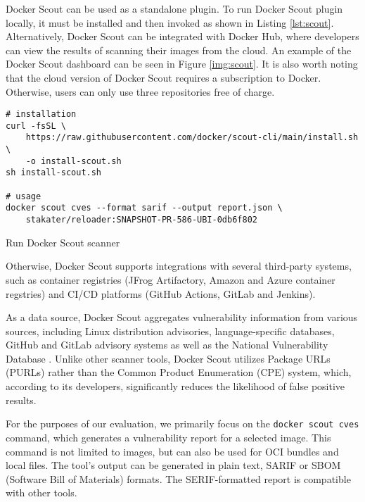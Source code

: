 Docker Scout can be used as a standalone plugin. To run Docker Scout plugin locally, it must be installed and then invoked as shown in Listing \ref{lst:scout}. Alternatively, Docker Scout can be integrated with Docker Hub, where developers can view the results of scanning their images from the cloud. An example of the Docker Scout dashboard can be seen in Figure \ref{img:scout}. It is also worth noting that the cloud version of Docker Scout requires a subscription to Docker. Otherwise, users can only use three repositories free of charge.


\begin{listing}[htp]
    \centering
    \begin{minipage}{1\linewidth}
        \begin{verbatim}
# installation
curl -fsSL \
    https://raw.githubusercontent.com/docker/scout-cli/main/install.sh \
    -o install-scout.sh
sh install-scout.sh

# usage
docker scout cves --format sarif --output report.json \
    stakater/reloader:SNAPSHOT-PR-586-UBI-0db6f802
        \end{verbatim}
    \end{minipage}
    \caption{Run Docker Scout scanner}
    \label{lst:scout}
\end{listing}

Otherwise, Docker Scout supports integrations with several third-party systems, such as container registries (JFrog Artifactory, Amazon and Azure container regstries) and CI/CD platforms (GitHub Actions, GitLab and Jenkins).

As a data source, Docker Scout aggregates vulnerability information from various sources, including Linux distribution advisories, language-specific databases, GitHub and GitLab advisory systems as well as the National Vulnerability Database \cite{d:scoutdb}. Unlike other scanner tools, Docker Scout utilizes Package URLs (PURLs) rather than the Common Product Enumeration (CPE) system, which, according to its developers, significantly reduces the likelihood of false positive results.


For the purposes of our evaluation, we primarily focus on the \texttt{docker scout cves} command, which generates a vulnerability report for a selected image. This command is not limited to images, but can also be used for OCI bundles and local files. The tool's output can be generated in plain text, SARIF or SBOM (Software Bill of Materials) formats. The SERIF-formatted report is compatible with other tools.


